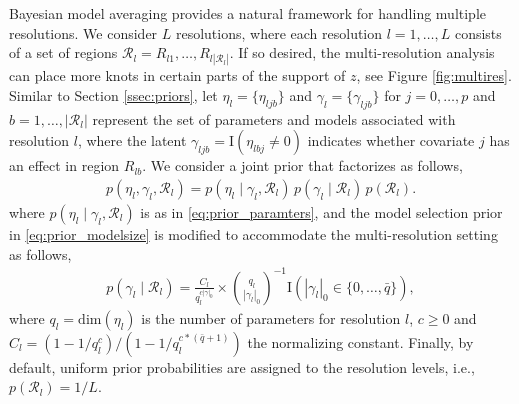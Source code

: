 Bayesian model averaging provides a natural framework for handling multiple resolutions.  We consider $L$ resolutions, where each resolution $l=1,\ldots,L$ consists of a set of regions $\mathcal{R}_l={R}_{l1},\ldots,R_{l |\mathcal{R}_l|}$. 
 If so desired, the multi-resolution analysis can place more knots in certain parts of the support of $z$, see Figure \ref{fig:multires}. 
Similar to Section \ref{ssec:priors}, let $\eta_l=\{ \eta_{ljb} \}$ and $\gamma_l=\{ \gamma_{ljb} \}$ for $j=0,\ldots,p$ and $b=1,\ldots,|\mathcal{R}_l|$ represent the set of parameters and models associated with resolution $l$,
where the latent $\gamma_{ljb}= \mbox{I}(\eta_{lbj} \neq 0)$  indicates whether covariate $j$ has an effect in region $R_{lb}$. We consider a joint prior that factorizes as follows,
\begin{align}
 p(\eta_l, \gamma_l, \mathcal{R}_l)= p(\eta_l \mid \gamma_l, \mathcal{R}_l)\, p(\gamma_l \mid \mathcal{R}_l) \, p(\mathcal{R}_l).
\nonumber
\end{align}
where $p(\eta_l \mid \gamma_l, \mathcal{R}_l)$ is as in \eqref{eq:prior_paramters},
and the model selection prior in \eqref{eq:prior_modelsize} is modified to accommodate the multi-resolution setting as follows,
\begin{align}
p(\gamma_l \mid \mathcal{R}_l)=
\frac{C_l}{q_l^{c |\gamma|_0}} \times {q_l \choose |\gamma_l|_0}^{-1} \mbox{I}(|\gamma_l|_0 \in \{0,\ldots,\bar{q}\}),
\nonumber
\end{align}
where $q_l= \mbox{dim}(\eta_l)$ is the number of parameters for resolution $l$,  $c \geq 0$ and $C_l=(1 - 1/q_l^c) / (1-1/q_l^{c*(\bar{q}+1)})$ the normalizing constant.
Finally, by default, uniform prior probabilities are assigned to the resolution levels, i.e., $p(\mathcal{R}_l)=1/L$.


